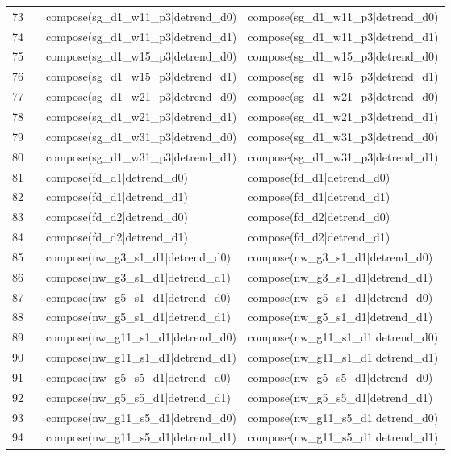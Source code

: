 \begin{tabular}{rlll}
73 &  & compose(sg\_d1\_w11\_p3|detrend\_d0) & compose(sg\_d1\_w11\_p3|detrend\_d0) \\
74 &  & compose(sg\_d1\_w11\_p3|detrend\_d1) & compose(sg\_d1\_w11\_p3|detrend\_d1) \\
75 &  & compose(sg\_d1\_w15\_p3|detrend\_d0) & compose(sg\_d1\_w15\_p3|detrend\_d0) \\
76 &  & compose(sg\_d1\_w15\_p3|detrend\_d1) & compose(sg\_d1\_w15\_p3|detrend\_d1) \\
77 &  & compose(sg\_d1\_w21\_p3|detrend\_d0) & compose(sg\_d1\_w21\_p3|detrend\_d0) \\
78 &  & compose(sg\_d1\_w21\_p3|detrend\_d1) & compose(sg\_d1\_w21\_p3|detrend\_d1) \\
79 &  & compose(sg\_d1\_w31\_p3|detrend\_d0) & compose(sg\_d1\_w31\_p3|detrend\_d0) \\
80 &  & compose(sg\_d1\_w31\_p3|detrend\_d1) & compose(sg\_d1\_w31\_p3|detrend\_d1) \\
81 &  & compose(fd\_d1|detrend\_d0) & compose(fd\_d1|detrend\_d0) \\
82 &  & compose(fd\_d1|detrend\_d1) & compose(fd\_d1|detrend\_d1) \\
83 &  & compose(fd\_d2|detrend\_d0) & compose(fd\_d2|detrend\_d0) \\
84 &  & compose(fd\_d2|detrend\_d1) & compose(fd\_d2|detrend\_d1) \\
85 &  & compose(nw\_g3\_s1\_d1|detrend\_d0) & compose(nw\_g3\_s1\_d1|detrend\_d0) \\
86 &  & compose(nw\_g3\_s1\_d1|detrend\_d1) & compose(nw\_g3\_s1\_d1|detrend\_d1) \\
87 &  & compose(nw\_g5\_s1\_d1|detrend\_d0) & compose(nw\_g5\_s1\_d1|detrend\_d0) \\
88 &  & compose(nw\_g5\_s1\_d1|detrend\_d1) & compose(nw\_g5\_s1\_d1|detrend\_d1) \\
89 &  & compose(nw\_g11\_s1\_d1|detrend\_d0) & compose(nw\_g11\_s1\_d1|detrend\_d0) \\
90 &  & compose(nw\_g11\_s1\_d1|detrend\_d1) & compose(nw\_g11\_s1\_d1|detrend\_d1) \\
91 &  & compose(nw\_g5\_s5\_d1|detrend\_d0) & compose(nw\_g5\_s5\_d1|detrend\_d0) \\
92 &  & compose(nw\_g5\_s5\_d1|detrend\_d1) & compose(nw\_g5\_s5\_d1|detrend\_d1) \\
93 &  & compose(nw\_g11\_s5\_d1|detrend\_d0) & compose(nw\_g11\_s5\_d1|detrend\_d0) \\
94 &  & compose(nw\_g11\_s5\_d1|detrend\_d1) & compose(nw\_g11\_s5\_d1|detrend\_d1) \\

\end{tabular}
